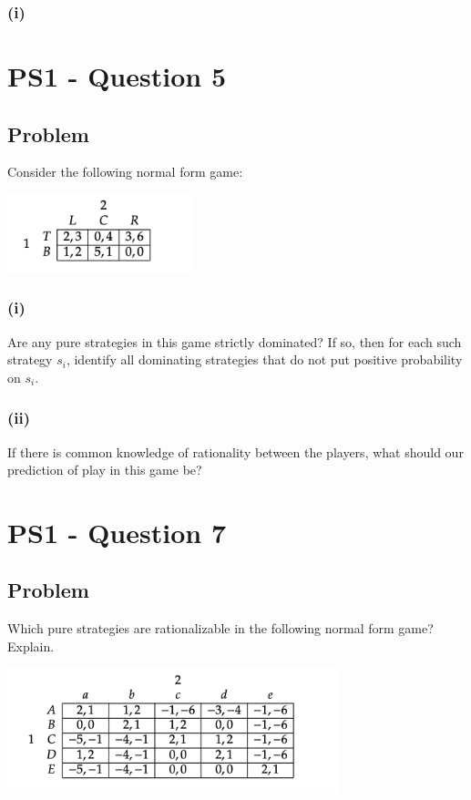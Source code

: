 \documentclass[10pt, a4paper]{article}
\begin{document}
    \subsubsection*{(i)}
      
\section*{PS1 - Question 5}
  \subsection*{Problem}
    Consider the following normal form game:
    \begin{center}
      \includegraphics[width = 0.4\textwidth]{PS1-5.png}
    \end{center}
    \subsubsection*{(i)}
      Are any pure strategies in this game strictly dominated? If so, then for each such strategy $s_i$, identify all dominating strategies that do not put positive probability on $s_i$.
    \subsubsection*{(ii)}
      If there is common knowledge of rationality between the players, what should our prediction of play in this game be?
\section*{PS1 - Question 7}
  \subsection*{Problem}
    Which pure strategies are rationalizable in the following normal form game? Explain.
    \begin{center}
      \includegraphics[width = 0.72\textwidth]{PS1-7.png}
    \end{center}
\end{document}
